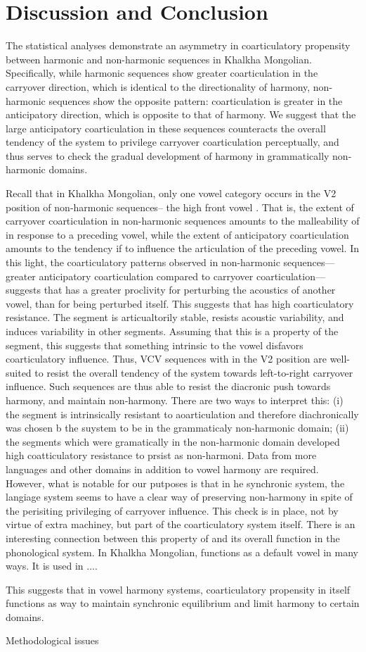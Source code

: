 \documentclass[a4paper,11pt,twocolumn]{article}
\newcommand{\wt}[1]{\textipa{/#1/}} %
\begin{document}
	\section{Discussion and Conclusion}
	The statistical analyses demonstrate an asymmetry in coarticulatory propensity between harmonic and non-harmonic sequences in Khalkha Mongolian. Specifically, while harmonic sequences show greater coarticulation in the carryover direction, which is identical to the directionality of harmony, non-harmonic sequences show the opposite pattern: coarticulation is greater in the anticipatory direction, which is opposite to that of harmony. We suggest that the large anticipatory coarticulation in these sequences counteracts the overall tendency of the system to privilege carryover coarticulation perceptually, and thus serves to check the gradual development of harmony in grammatically non-harmonic domains. 
	
	Recall that in Khalkha Mongolian, only one vowel category occurs in the V2 position of non-harmonic sequences-- the high front vowel \wt{i}. That is, the extent of carryover coarticulation in non-harmonic sequences amounts to the malleability of \wt{i} in response to a preceding vowel, while the extent of anticipatory coarticulation amounts to the tendency if \wt{i} to influence the articulation of the preceding vowel. In this light, the coarticulatory patterns observed in non-harmonic sequences---greater anticipatory coarticulation compared to carryover coarticulation--- suggests that \wt{i} has a greater proclivity for perturbing the acoustics of another vowel, than for being perturbed itself. This suggests that \wt{i} has high coarticulatory resistance. The segment is articualtorily stable, resists acoustic variability, and induces variability in other segments. Assuming that this is a property of the segment, this suggests that something intrinsic to the vowel disfavors coarticulatory influence. Thus, VCV sequences with \wt{i} in the V2 position are well-suited to resist the overall tendency of the system towards left-to-right carryover influence. Such sequences are thus able to resist the diacronic push towards harmony, and maintain non-harmony. There are two ways to interpret this: (i) the segment is intrinsically resistant to aoarticulation and therefore diachronically was chosen b the suystem to be in the grammaticaly non-harmonic domain; (ii) the segments which were gramatically in the non-harmonic domain developed high coatticulatory resistance to prsist as non-harmoni. Data from more languages and other domains in addition to vowel harmony are required. However, what is notable for our putposes is that in he synchronic system, the langiage system seems to have a clear way of preserving non-harmony in spite of the perisiting privileging of carryover influence. This check is in place, not by virtue of extra machiney, but part of the coarticulatory system itself. There is an interesting connection between this property of \wt{i} and its overall function in the phonological system. In Khalkha Mongolian, \wt{i} functions as a default vowel in many ways. It is used in ....
	  
	This suggests that in vowel harmony systems, coarticulatory propensity in itself functions as way to maintain synchronic equilibrium and limit harmony to certain domains.
	
	Methodological issues
	
	
	
	
	\theendnotes
	
\end{document}
